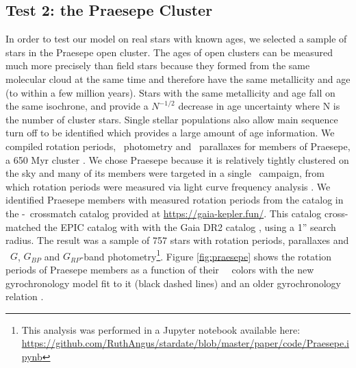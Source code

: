 \subsection{Test 2: the Praesepe Cluster}
In order to test our model on real stars with known ages, we selected a sample
of stars in the Praesepe open cluster.
The ages of open clusters can be measured much more precisely than field stars
because they formed from the same molecular cloud at the same time and
therefore have the same metallicity and age (to within a few million years).
Stars with the same metallicity and age fall on the same isochrone, and
provide a $N^{-1/2}$ decrease in age uncertainty where N is the number of
cluster stars.
Single stellar populations also allow main sequence turn off to be identified
which provides a large amount of age information.
We compiled rotation periods, \Gaia\ photometry and \gaia\ parallaxes for
members of Praesepe, a 650 Myr cluster \citep{fossati2008}.
We chose Praesepe because it is relatively tightly clustered on the sky and
many of its members were targeted in a single \ktwo\ campaign, from which
rotation periods were measured via light curve frequency analysis
\citep{douglas2017, rebull2017}.
We identified Praesepe members with measured rotation periods from the
\citet{douglas2017} catalog in the \ktwo-\gaia\ crossmatch catalog provided at
\url{https://gaia-kepler.fun/}.
This catalog cross-matched the EPIC catalog \citep{huber2016} with with the
Gaia DR2 catalog \citep{brown2018}, using a 1'' search radius.
The result was a sample of 757 stars with rotation periods, parallaxes and
\gaia\ $G$, $G_{BP}$ and $G_{RP}$-band photometry\footnote{This analysis was
performed in a Jupyter notebook available here:
\url{
https://github.com/RuthAngus/stardate/blob/master/paper/code/Praesepe.ipynb}}.
Figure \ref{fig:praesepe} shows the rotation periods of Praesepe members as a
function of their \gaia\ \gcolor\ colors with the new gyrochronology model fit
to it (black dashed lines) and an older gyrochronology relation
\citep{angus2015}.
